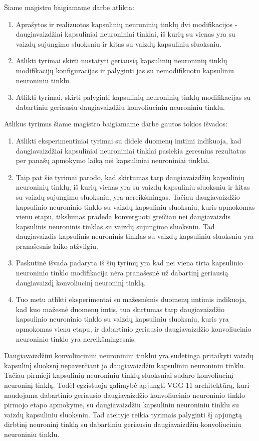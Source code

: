 
Šiame magistro baigiamame darbe atlikta:

\begin{enumerate}
	\item Aprašytos ir realizuotos kapsulinių neuroninių tinklų dvi modifikacijos - daugiavaizdžiai kapsuliniai neuroniniai tinklai, iš kurių su vienas yra su vaizdų sujungimo sluoksniu ir kitas su vaizdų kapsuliniu sluoksniu.
	\item Atlikti tyrimai skirti nustatyti geriausią kapsulinių neuroninių tinklų modifikacijų konfigūracijas ir palyginti jas su nemodifikuotu kapsuliniu neuroniniu tinklu.
	\item Atlikti tyrimai, skirti palyginti kapsulinių neuroninių tinklų modifikacijas su dabartiniu geriausiu daugiavaizdžiu konvoliuciniu neuroniniu tinklu.
\end{enumerate}

Atlikus tyrimus šiame magistro baigiamame darbe gautos tokios išvados:

\begin{enumerate}
	\item Atlikti eksperimentiniai tyrimai su didele duomenų imtimi indikuoja, kad daugiavaizdžiai kapsuliniai neuroniniai tinklai pasiekia geresnius rezultatus per panašų apmokymo laiką nei kapsuliniai neuroniniai tinklai.
	\item Taip pat šie tyrimai parodo, kad skirtumas tarp daugiavaizdžių kapsulinių neuroninių tinklų, iš kurių vienas yra su vaizdų kapsuliniu sluoksniu ir kitas su vaizdų sujungimo sluoksniu, yra nereikšmingas. Tačiau daugiavaizdžio kapsulinio neuroninio tinklo su vaizdų kapsuliniu sluoksniu, kuris apmokomas vienu etapu, tikslumas pradeda konverguoti greičiau nei daugiavaizdis kapsulinis neuroninis tinklas su vaizdų sujungimo sluoksniu. Tad daugiavaizdis kapsulinis neuroninis tinklas su vaizdų kapsuliniu sluoksniu yra pranašesnis laiko atžvilgiu.
	\item Paskutinė išvada padaryta iš šių tyrimų yra kad nei viena tirta kapsulinio neuroninio tinklo modifikacija nėra pranašesnė už dabartinį geriausią daugiavaizdį konvoliucinį neuroninį tinklą.
	\item Tuo metu atlikti eksperimentai su mažesnėmis duomenų imtimis indikuoja, kad kuo mažesnė duomenų imtis, tuo skirtumas tarp daugiavaizdžio kapsulinio neuroninio tinklo su vaizdų kapsuliniu sluoksniu, kuris yra apmokomas vienu etapu, ir dabartinio geriausio daugiavaizdžio konvoliucinio neuroninio tinklo yra nereikšmingesnis.
\end{enumerate}

Daugiavaizdžiui konvoliuciniui neuroniniui tinklui yra sudėtinga pritaikyti vaizdų kapsulinį sluoksnį nepaverčiant jo daugiavaizdžiu kapsuliniu neuroniniu tinklu. Tačiau pirmieji kapsulinių neuroninių tinklų sluoksniai sudaro konvoliucinį neuroninį tinklą. Todėl egzistuoja galimybė apjungti VGG-11 architektūrą, kuri naudojama dabartinio geriausio daugiavaizdžio konvoliucinio neuroninio tinklo pirmojo etapo apmokyme, su daugiavaizdžiu kapsuliniu neuroniniu tinklu su vaizdų kapsuliniu sluoksniu. Tad ateityje reikia tyrimais palyginti šį apjungtą dirbtinį neuroninį tinklą su dabartiniu geriausiu daugiavaizdžiu konvoliuciniu neuroniniu tinklu.
